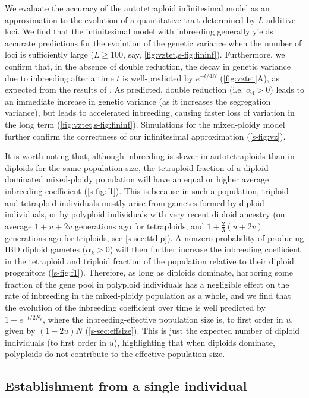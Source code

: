 \documentclass[12pt,a4paper]{article}
\begin{document}
We evaluate the accuracy of the autotetraploid infinitesimal model as an
approximation to the evolution of a quantitative trait determined by $L$
additive loci.
We find that the infinitesimal model with inbreeding generally yields accurate
predictions for the evolution of the genetic variance when the number of loci
is sufficiently large ($L \ge 100$, say, \cref{fig:vztet,s-fig:fininf}).
Furthermore, we confirm that, in the absence of double reduction, the decay in
genetic variance due to inbreeding after a time $t$ is well-predicted by
$e^{-t/4N}$ (\cref{fig:vztet}A), as expected from the results of \cite{arnold2012}.
As predicted, double reduction (i.e. $\alpha_4 > 0$) leads to an immediate
increase in genetic variance (as it increases the segregation variance), but
leads to accelerated inbreeding, causing faster loss of variation in the
long term (\cref{fig:vztet,s-fig:fininf}).
Simulations for the mixed-ploidy model further confirm the correctness of our
infinitesimal approximation (\cref{s-fig:vz}).

It is worth noting that, although inbreeding is slower in autotetraploids than
in diploids for the same population size, the tetraploid fraction of a
diploid-dominated mixed-ploidy population will have an equal or higher average
inbreeding coefficient (\cref{s-fig:f1}).
This is because in such a population, triploid and tetraploid individuals
mostly arise from gametes formed by diploid individuals, or by polyploid
individuals with very recent diploid ancestry (on average $1+u+2v$ generations ago
for tetraploids, and $1+\frac{2}{3}(u+2v)$ generations ago for triploids, see
\cref{s-sec:ttdip}).
A nonzero probability of producing IBD diploid gametes ($\alpha_k > 0$) will
then further increase the inbreeding coefficient in the tetraploid and triploid
fraction of the population relative to their diploid progenitors
(\cref{s-fig:f1}).
Therefore, as long as diploids dominate, harboring some fraction of the gene
pool in polyploid individuals has a negligible effect on the rate of inbreeding
in the mixed-ploidy population as a whole, and we find that the evolution of
the inbreeding coefficient over time is well predicted by $1-e^{-t/2N_e}$,
where the inbreeding-effective population size is, to first order in $u$, given
by $(1-2u)N$ (\cref{s-sec:effsize}). This is just the expected number of
diploid individuals (to first order in $u$), highlighting that when diploids
dominate, polyploids do not contribute to the effective population size. 


\subsection*{Establishment from a single individual}
\end{document}
